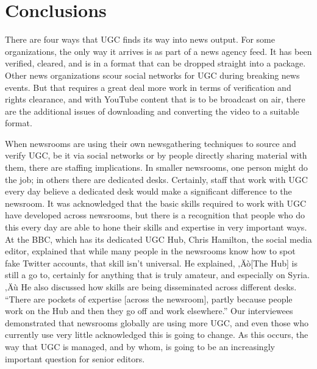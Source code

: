 \documentclass[symmetric, notoc, nobib]{towcenter-book}
\begin{document}
\section{Conclusions}
There are four ways that UGC finds its way into news output. For some
organizations, the only way it arrives is as part of a news agency feed. It has
been verified, cleared, and is in a format that can be dropped straight into a
package. Other news organizations scour social networks for UGC during
breaking news events. But that requires a great deal more work in terms of
verification and rights clearance, and with YouTube content that is to be
broadcast on air, there are the additional issues of downloading and converting
the video to a suitable format.

When newsrooms are using their own newsgathering techniques to source
and verify UGC, be it via social networks or by people directly sharing
material with them, there are staffing implications. In smaller newsrooms,
one person might do the job; in others there are dedicated desks. Certainly,
staff that work with UGC every day believe a dedicated desk would make a
significant difference to the newsroom.
It was acknowledged that the basic skills required to work with UGC have
developed across newsrooms, but there is a recognition that people who
do this every day are able to hone their skills and expertise in very important
ways. At the BBC, which has its dedicated UGC Hub, Chris Hamilton,
the social media editor, explained that while many people in the newsrooms
know how to spot fake Twitter accounts, that skill isn't universal.
He explained, ‚Äò[The Hub] is still a go to, certainly for anything that is truly
amateur, and especially on Syria.‚Äù He also discussed how skills are being
disseminated across different desks. ``There are pockets of expertise [across
the newsroom], partly because people work on the Hub and then they go
off and work elsewhere.''
Our interviewees demonstrated that newsrooms globally are using more
UGC, and even those who currently use very little acknowledged this is
going to change. As this occurs, the way that UGC is managed, and by
whom, is going to be an increasingly important question for senior editors.
\end{document}
